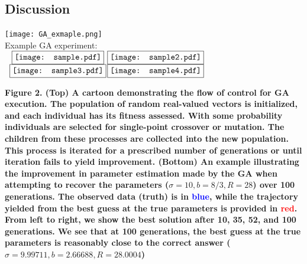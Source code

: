 \documentclass[onecolumn]{article}
\begin{document}
\begin{multicols}{2}
\section{Discussion}



\clearpage
\begin{center}
	\texttt{[image: GA\_exmaple.png]}\\
	{\flushleft Example GA experiment:}\\
	$\begin{array}{cc}
		\fbox{\texttt{[image: sample.pdf]}}&
		\hspace{-.3cm}\fbox{\texttt{[image: sample2.pdf]}}\\
		\fbox{\texttt{[image: sample3.pdf]}}&		
		\hspace{-.3cm}\fbox{\texttt{[image: sample4.pdf]}}				
	\end{array}$
\end{center}
{\bf\small Figure 2. (Top) A cartoon demonstrating the flow of control for GA execution. The population of random real-valued vectors is initialized, and each individual has its fitness assessed. With some probability individuals are selected for single-point crossover or mutation. The children from these processes are collected into the new population. This process is iterated for a prescribed number of generations or until iteration fails to yield improvement. (Bottom) An example illustrating the improvement in parameter estimation made by the GA when attempting to recover the parameters ($\sigma=10,b=8/3,R=28$) over 100 generations. The observed data (truth) is in \textcolor{blue}{blue}, while the trajectory yielded from the best guess at the true parameters is provided in \textcolor{red}{red}. From left to right, we show the best solution after 10, 35, 52, and 100 generations. We see that at 100 generations, the best guess at the true parameters is reasonably close to the correct answer ($\sigma=9.99711,b=2.66688,R=28.0004$)}\\


\end{multicols}
\end{document}
